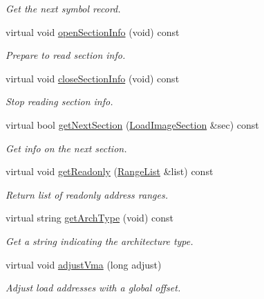 \begin{DoxyCompactItemize}
\begin{DoxyCompactList}\small\item\em Get the next symbol record. \end{DoxyCompactList}\item 
virtual void \mbox{\hyperlink{class_load_image_bfd_a48e82236ac85863f02e49e3ecae877e1}{open\+Section\+Info}} (void) const
\begin{DoxyCompactList}\small\item\em Prepare to read section info. \end{DoxyCompactList}\item 
virtual void \mbox{\hyperlink{class_load_image_bfd_ab09105d243f255c2bece8d27803cb4c5}{close\+Section\+Info}} (void) const
\begin{DoxyCompactList}\small\item\em Stop reading section info. \end{DoxyCompactList}\item 
virtual bool \mbox{\hyperlink{class_load_image_bfd_aaae78fac403213f2dc9ebf97ac28a5b2}{get\+Next\+Section}} (\mbox{\hyperlink{struct_load_image_section}{Load\+Image\+Section}} \&sec) const
\begin{DoxyCompactList}\small\item\em Get info on the next section. \end{DoxyCompactList}\item 
virtual void \mbox{\hyperlink{class_load_image_bfd_a8a45d7f2aaa3ae3028f997978f1d9d0c}{get\+Readonly}} (\mbox{\hyperlink{class_range_list}{Range\+List}} \&list) const
\begin{DoxyCompactList}\small\item\em Return list of {\itshape readonly} address ranges. \end{DoxyCompactList}\item 
virtual string \mbox{\hyperlink{class_load_image_bfd_a20f8ec53008fada4bd5c8e4d2d712ca9}{get\+Arch\+Type}} (void) const
\begin{DoxyCompactList}\small\item\em Get a string indicating the architecture type. \end{DoxyCompactList}\item 
virtual void \mbox{\hyperlink{class_load_image_bfd_a92442c79bbcb55ef602bd9cb092da87e}{adjust\+Vma}} (long adjust)
\begin{DoxyCompactList}\small\item\em Adjust load addresses with a global offset. \end{DoxyCompactList}\end{DoxyCompactItemize}
